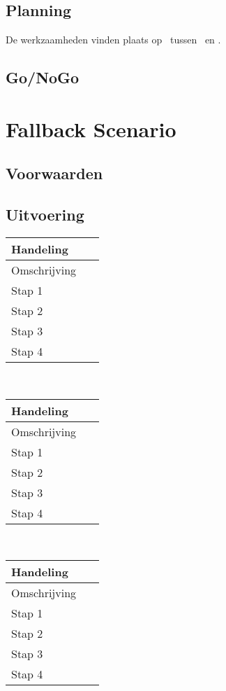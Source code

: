 \documentclass[10pt,a4paper]{report}
\begin{document}
\section{Planning}
De werkzaamheden vinden plaats op \StartDatum \ tussen \StartTijd \ en \EindTijd.
\section{Go/NoGo}
\chapter{Fallback Scenario}
\section{Voorwaarden}
\section{Uitvoering}
\begin{tabular}{| l | l |}
\hline
\cellcolor[gray]{0.84}Handeling & \ \\
\hline
\cellcolor[gray]{0.84}Omschrijving & \ \\
\hline
\cellcolor[gray]{0.84}Stap 1 & \ \\
\hline
\cellcolor[gray]{0.84}Stap 2 & \ \\
\hline
\cellcolor[gray]{0.84}Stap 3 & \ \\
\hline
\cellcolor[gray]{0.84}Stap 4 & \ \\
\hline
\end{tabular}
\\

\begin{tabular}{| l | l |}
\hline
\cellcolor[gray]{0.84}Handeling & \ \\
\hline
\cellcolor[gray]{0.84}Omschrijving & \ \\
\hline
\cellcolor[gray]{0.84}Stap 1 & \ \\
\hline
\cellcolor[gray]{0.84}Stap 2 & \ \\
\hline
\cellcolor[gray]{0.84}Stap 3 & \ \\
\hline
\cellcolor[gray]{0.84}Stap 4 & \ \\
\hline
\end{tabular}
\\

\begin{tabular}{| l | l |}
\hline
\cellcolor[gray]{0.84}Handeling & \ \\
\hline
\cellcolor[gray]{0.84}Omschrijving & \ \\
\hline
\cellcolor[gray]{0.84}Stap 1 & \ \\
\hline
\cellcolor[gray]{0.84}Stap 2 & \ \\
\hline
\cellcolor[gray]{0.84}Stap 3 & \ \\
\hline
\cellcolor[gray]{0.84}Stap 4 & \ \\
\hline
\end{tabular}
\end{document}
